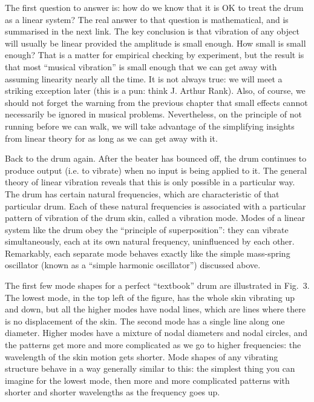  The first question to answer is: how do we know that it is OK to treat the 
  drum as a linear system? The real answer to that question is mathematical, 
  and is summarised in the next link. The key conclusion is that vibration of 
  any object will usually be linear provided the amplitude is small enough. How 
  small is small enough? That is a matter for empirical checking by experiment, 
  but the result is that most ``musical vibration'' is small enough that we can 
  get away with assuming linearity nearly all the time. It is not always true: 
  we will meet a striking exception later (this is a pun: think J. Arthur 
  Rank). Also, of course, we should not forget the warning from the previous 
  chapter that small effects cannot necessarily be ignored in musical problems. 
  Nevertheless, on the principle of not running before we can walk, we will 
  take advantage of the simplifying insights from linear theory for as long as 
  we can get away with it. 

  Back to the drum again. After the beater has bounced off, the drum continues 
  to produce output (i.e. to vibrate) when no input is being applied to it. The 
  general theory of linear vibration reveals that this is only possible in a 
  particular way. The drum has certain natural frequencies, which are 
  characteristic of that particular drum. Each of these natural frequencies is 
  associated with a particular pattern of vibration of the drum skin, called a 
  vibration mode. Modes of a linear system like the drum obey the ``principle 
  of superposition'': they can vibrate simultaneously, each at its own natural 
  frequency, uninfluenced by each other. Remarkably, each separate mode behaves 
  exactly like the simple mass-spring oscillator (known as a ``simple harmonic 
  oscillator'') discussed above. 

  The first few mode shapes for a perfect ``textbook'' drum are illustrated in 
  Fig.\ 3. The lowest mode, in the top left of the figure, has the whole skin 
  vibrating up and down, but all the higher modes have nodal lines, which are 
  lines where there is no displacement of the skin. The second mode has a 
  single line along one diameter. Higher modes have a mixture of nodal 
  diameters and nodal circles, and the patterns get more and more complicated 
  as we go to higher frequencies: the wavelength of the skin motion gets 
  shorter. Mode shapes of any vibrating structure behave in a way generally 
  similar to this: the simplest thing you can imagine for the lowest mode, then 
  more and more complicated patterns with shorter and shorter wavelengths as 
  the frequency goes up. 

